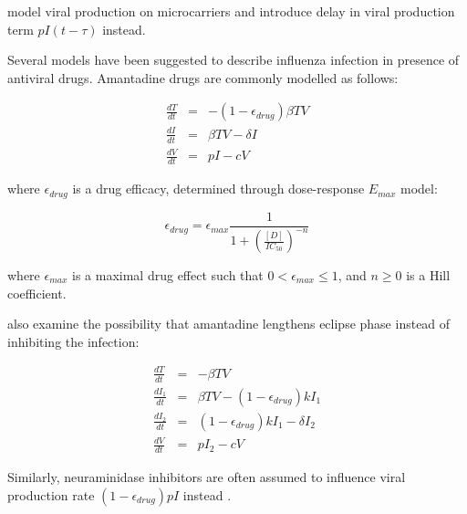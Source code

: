 \cite{mohler2005mathematical,schulze2009infection} model viral production on microcarriers and introduce delay in viral production term $p I(t - \tau)$ instead.

Several models have been suggested to describe influenza infection in presence of antiviral drugs. Amantadine drugs are commonly modelled as follows:

\begin{equation}
\begin{array}{rcl}
\frac{dT}{dt} &=& - (1-\epsilon_{drug})\beta T V \\
\frac{dI}{dt} &=& \beta T V - \delta I \\
\frac{dV}{dt} &=& p I - c V
\end{array}
\end{equation}

where $\epsilon_{drug}$ is a drug efficacy, determined through dose-response $E_{max}$ model:

\begin{equation}
\epsilon_{drug} = \epsilon_{max}\frac{1}{1 + (\frac{[D]}{IC_{50}})^{-n}}
\end{equation}

where $\epsilon_{max}$ is a maximal drug effect such that $0 < \epsilon_{max} \le 1$, and $n \ge 0$ is a Hill coefficient.

\cite{beauchemin2008modeling} also examine the possibility that amantadine lengthens eclipse phase instead of inhibiting the infection:

\begin{equation}
\begin{array}{rcl}
\frac{dT}{dt} &=& - \beta T V \\
\frac{dI_1}{dt} &=& \beta T V - (1-\epsilon_{drug}) k I_1 \\
\frac{dI_2}{dt} &=& (1-\epsilon_{drug}) k I_1 - \delta I_2 \\
\frac{dV}{dt} &=& p I_2 - c V
\end{array}
\end{equation}

Similarly, neuraminidase inhibitors are often assumed to influence viral production rate $(1-\epsilon_{drug}) p I$ instead \cite{handel2007neuraminidase}.